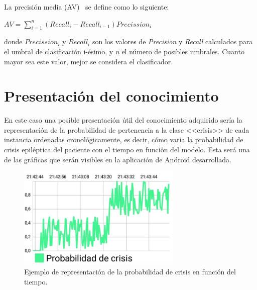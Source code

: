 La precisión media (AV)~\cite{precisionrecall} se define como lo siguiente: 

\begin{center}
	$AV=\sum_{i=1}^{n}(Recall_{i}-Recall_{i-1})Precission_{i}$
\end{center}

\noindent donde $Precission_{i}$ y $Recall_{i}$ son los valores de \textit{Precision} y \textit{Recall} calculados para el umbral de clasificación i-ésimo, y \textit{n} el número de posibles umbrales. Cuanto mayor sea este valor, mejor se considera el clasificador. 

\section{Presentación del conocimiento}

En este caso una posible presentación útil del conocimiento adquirido sería la representación de la probabilidad de pertenencia a la clase <<crisis>> de cada instancia ordenadas cronológicamente, es decir, cómo varía la probabilidad de crisis epiléptica del paciente con el tiempo en función del modelo. Esta será una de las gráficas que serán visibles en la aplicación de Android desarrollada. 

\begin{figure}[H]
	\centering
	\includegraphics[width=0.7\textwidth]{../img/prob.png}
	\caption{Ejemplo de representación de la probabilidad de crisis en función del tiempo.}
	\label{fig:prob}
\end{figure} 

